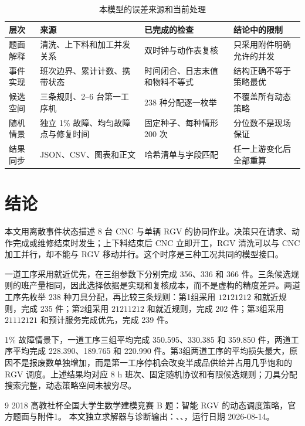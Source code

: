 \documentclass[UTF8,11pt,a4paper]{ctexart}
\begin{document}
\begin{table}[H]
\centering
\caption{本模型的误差来源和当前处理}
\label{tab:error-budget-b}
\small
\begin{tabularx}{\textwidth}{p{2.8cm}p{4.2cm}p{4.2cm}X}
\toprule
层次 & 来源 & 已完成的检查 & 结论中的限制\\
\midrule
题面解释 & 清洗、上下料和加工并发关系 & 双时钟与动作表复核 & 只采用附件明确允许的并发\\
事件实现 & 班次边界、累计计数、携带状态 & 时间闭合、日志末值和物料不等式 & 结构正确不等于策略最优\\
候选空间 & 三条规则、2--6 台第一工序机 & 238 种分配逐一枚举 & 不覆盖所有动态策略\\
随机情景 & 独立 1\% 故障、均匀故障点与修复时间 & 固定种子、每种情形 200 次 & 分位数不是现场保证\\
结果同步 & JSON、CSV、图表和正文 & 哈希清单与字段匹配 & 任一上游变化后全部重算\\
\bottomrule
\end{tabularx}
\end{table}

\section{结论}

本文用离散事件状态描述 8 台 CNC 与单辆 RGV 的协同作业。决策只在请求、动作完成或维修结束时发生；上下料结束后 CNC 立即开工，RGV 清洗可以与 CNC 加工并行，却不能与 RGV 移动并行。这个时序是三种工况共同的模型接口。

一道工序采用就近优先，在三组参数下分别完成 356、336 和 366 件。三条候选规则的班产量相同，因此选择依据是实现和复核成本，而不是虚构的精度差异。两道工序先枚举 238 种刀具分配，再比较三条规则：第1组采用 $12121212$ 和就近规则，完成 235 件；第2组采用 $21211212$ 和就近规则，完成 202 件；第3组采用 $21112121$ 和预计服务完成优先，完成 239 件。

1\% 故障情景下，一道工序三组平均完成 350.595、330.385 和 359.850 件，两道工序平均完成 228.390、189.765 和 220.990 件。第3组两道工序的平均损失最大，原因不是报废数单独增加，而是第一工序停机会改变半成品供给并占用几乎饱和的 RGV 调度。上述结果均对应 8 h 班次、固定随机协议和有限候选规则；刀具分配搜索完整，动态策略空间未被穷尽。

\label{mcm-body-end}

\begin{thebibliography}{9}
 2018 高教社杯全国大学生数学建模竞赛 B 题：智能 RGV 的动态调度策略，官方题面与附件1。
 本文独立求解器与诊断输出：、、，运行日期 2026-08-14。
\end{thebibliography}
\end{document}
